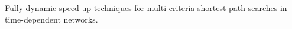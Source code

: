 

Fully dynamic speed-up techniques for multi-criteria shortest path searches in time-dependent networks.
\cite{berger2010fully}

\cite{holte2016bidirectional}
\cite{abraham2012hierarchical}






